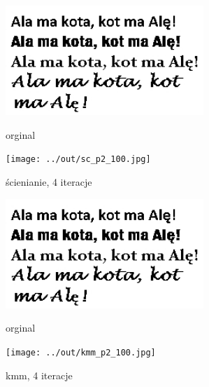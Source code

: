 \documentclass[a4paper,12pt]{article}
\begin{document}
\begin{figure}[h!]
\begin{minipage}[t]{7.5cm}
\begin{center}
\includegraphics[width=7.5cm]{../in/p2.jpg}
\caption{orginal}
\end{center}
\end{minipage}
\hfill
\begin{minipage}[t]{7.5cm}
\begin{center}
\texttt{[image: ../out/sc\_p2\_100.jpg]}
\caption{ścienianie, 4 iteracje}
\end{center}
\end{minipage}
\end{figure}

\begin{figure}[h!]
\begin{minipage}[t]{7.5cm}
\begin{center}
\includegraphics[width=7.5cm]{../in/p2.jpg}
\caption{orginal}
\end{center}
\end{minipage}
\hfill
\begin{minipage}[t]{7.5cm}
\begin{center}
\texttt{[image: ../out/kmm\_p2\_100.jpg]}
\caption{kmm, 4 iteracje}
\end{center}
\end{minipage}
\end{figure}
\end{document}
